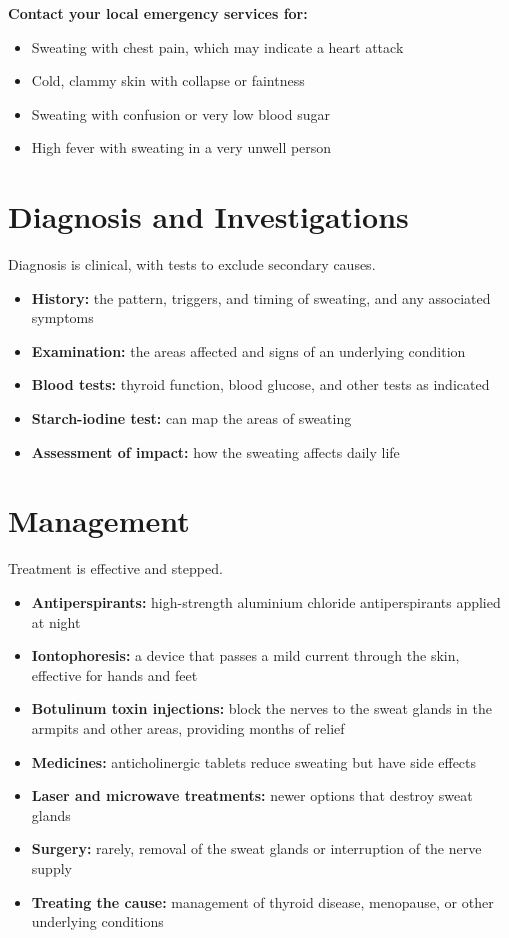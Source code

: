 \textbf{Contact your local emergency services for:}
\begin{itemize}
    \item Sweating with chest pain, which may indicate a heart attack
    \item Cold, clammy skin with collapse or faintness
    \item Sweating with confusion or very low blood sugar
    \item High fever with sweating in a very unwell person
\end{itemize}

\section*{Diagnosis and Investigations}
Diagnosis is clinical, with tests to exclude secondary causes.
\begin{itemize}
    \item \textbf{History:} the pattern, triggers, and timing of sweating, and any associated symptoms
    \item \textbf{Examination:} the areas affected and signs of an underlying condition
    \item \textbf{Blood tests:} thyroid function, blood glucose, and other tests as indicated
    \item \textbf{Starch-iodine test:} can map the areas of sweating
    \item \textbf{Assessment of impact:} how the sweating affects daily life
\end{itemize}

\section*{Management}
Treatment is effective and stepped.
\begin{itemize}
    \item \textbf{Antiperspirants:} high-strength aluminium chloride antiperspirants applied at night
    \item \textbf{Iontophoresis:} a device that passes a mild current through the skin, effective for hands and feet
    \item \textbf{Botulinum toxin injections:} block the nerves to the sweat glands in the armpits and other areas, providing months of relief
    \item \textbf{Medicines:} anticholinergic tablets reduce sweating but have side effects
    \item \textbf{Laser and microwave treatments:} newer options that destroy sweat glands
    \item \textbf{Surgery:} rarely, removal of the sweat glands or interruption of the nerve supply
    \item \textbf{Treating the cause:} management of thyroid disease, menopause, or other underlying conditions
\end{itemize}

